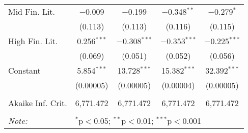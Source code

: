 \begin{table}[!htbp]
\begin{tabular}{@{\extracolsep{5pt}}lcccc}
  Mid Fin. Lit. & $-$0.009 & $-$0.199 & $-$0.348$^{**}$ & $-$0.279$^{*}$ \\ 
  & (0.113) & (0.113) & (0.116) & (0.115) \\ 
  High Fin. Lit. & 0.256$^{***}$ & $-$0.308$^{***}$ & $-$0.353$^{***}$ & $-$0.225$^{***}$ \\ 
  & (0.069) & (0.051) & (0.052) & (0.056) \\ 
  Constant & 5.854$^{***}$ & 13.728$^{***}$ & 15.382$^{***}$ & 32.392$^{***}$ \\ 
  & (0.00005) & (0.00005) & (0.00004) & (0.00005) \\ 
 \hline \\[-1.8ex] 
Akaike Inf. Crit. & 6,771.472 & 6,771.472 & 6,771.472 & 6,771.472 \\ 
\hline 
\hline \\[-1.8ex] 
\textit{Note:}  & \multicolumn{4}{l}{$^{*}$p$<$0.05; $^{**}$p$<$0.01; $^{***}$p$<$0.001} \\ 
\end{tabular} 
\end{table} 
